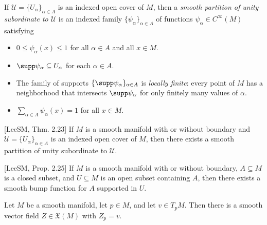 If $\mathcal{U} = \{U_\alpha\}_{\alpha \in A}$ is an indexed open cover of $M$, then a \textit{smooth partition of
unity subordinate to $\mathcal{U}$} is an indexed family $\{\psi_\alpha\}_{\alpha \in A}$ of functions $\psi_\alpha \in C^{\infty}(M)$
satisfying
\begin{itemize}
  \item $0 \le \psi_\alpha(x) \le 1$ for all $\alpha \in A$ and all $x \in M$.
  \item $\supp \psi_\alpha \subseteq U_\alpha$ for each $\alpha \in A$.
  \item The family of supports $\{\supp \psi_\alpha\}_{\alpha \in A}$ is \textit{locally finite}: every point of $M$ has a
    neighborhood that intersects $\supp \psi_\alpha$ for only finitely many values of $\alpha$.
  \item $\sum_{\alpha \in A} \psi_\alpha(x) = 1$ for all $x \in M$.
\end{itemize}

\begin{proposition}
\label{prop:existence-partitions-unity}
[LeeSM, Thm. 2.23] If $M$ is a smooth manifold with or without boundary and $\mathcal{U} = \{U_\alpha\}_{\alpha \in A}$ is an indexed open cover of $M$, then there exists a smooth partition of unity subordinate to $\mathcal{U}$.
\end{proposition}

\begin{proposition}
\label{prop:existence-smooth-bump-functions}
[LeeSM, Prop. 2.25] If $M$ is a smooth manifold with or without boundary, $A \subseteq M$ is a closed subset, and $U \subseteq M$ is an open subset containing $A$, then there exists a smooth bump function for $A$ supported in $U$.
\end{proposition}

\begin{lemma}
\label{lem:vector-field-extension-point}
\leanok
{}
Let $M$ be a smooth manifold, let $p \in M$, and let $v \in T_pM$. Then there is a smooth vector field $Z \in \mathfrak{X}(M)$ with $Z_p = v$.
\end{lemma}

